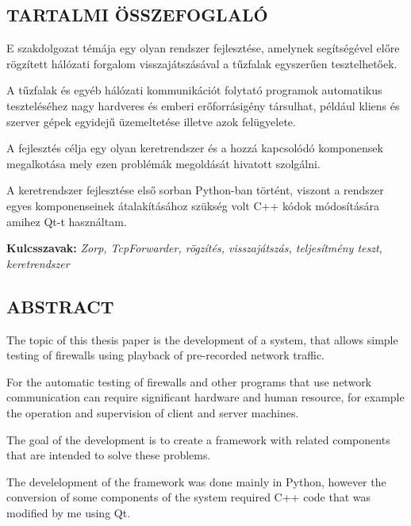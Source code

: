 \documentclass[a4paper,12pt,oneside]{report}
\begin{document}
\newpage
 
\begin{center}
\section*{\textbf{\Large \MakeUppercase{Tartalmi összefoglaló}}}
\end{center}

E szakdolgozat témája egy olyan rendszer fejlesztése, amelynek segítségével előre rögzített hálózati forgalom visszajátszásával a tűzfalak egyszerűen tesztelhetőek.

A tűzfalak és egyéb hálózati kommunikációt folytató programok automatikus teszteléséhez nagy hardveres és emberi erőforrásigény társulhat, például kliens és szerver gépek egyidejű üzemeltetése illetve azok felügyelete.

A fejlesztés célja egy olyan keretrendszer és a hozzá kapcsolódó komponensek megalkotása mely ezen problémák megoldását hivatott szolgálni.

A keretrendszer fejlesztése első sorban Python-ban történt, viszont a rendszer egyes komponenseinek átalakításához szükség volt C++ kódok módosítására amihez Qt-t használtam.

\vspace{2cm}
 
{\bf Kulcsszavak:} {\it Zorp, TcpForwarder, rögzítés, visszajátszás, teljesítmény teszt, keretrendszer}
\newpage
 
\begin{center}
\section*{\textbf{\Large \MakeUppercase{Abstract}}}
\end{center}

The topic of this thesis paper is the development of a system, that allows simple testing of firewalls using playback of pre-recorded network traffic.

For the automatic testing of firewalls and other programs that use network communication can require significant hardware and human resource, for example the operation and supervision of client and server machines.

The goal of the development is to create a framework with related components that are intended to solve these problems.

The develelopment of the framework was done mainly in Python, however the conversion of some components of the system required C++ code that was modified by me using Qt.
\end{document}
